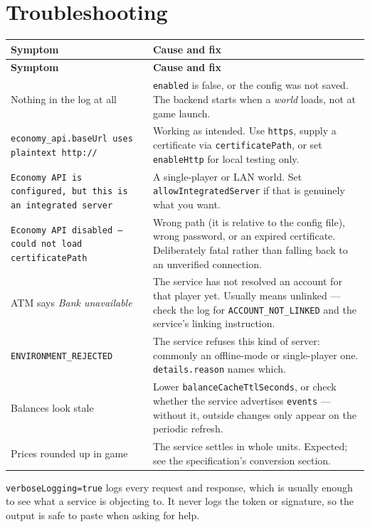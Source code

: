 \documentclass[11pt,a4paper]{article}
\newcommand{\code}[1]{\texttt{\small #1}}
\newcommand{\keybox}[2]{%
  \par\vspace{0.5em}\noindent
  \colorbox{#1}{\begin{minipage}{\dimexpr\linewidth-2\fboxsep\relax}
  \vspace{0.35em}\small #2\vspace{0.35em}\end{minipage}}\par\vspace{0.5em}}
\newcommand{\note}[1]{\keybox{omceWash}{#1}}
\begin{document}
\section{Troubleshooting}

\begin{longtable}{L{5.6cm} L{9.6cm}}
\toprule
\textbf{Symptom} & \textbf{Cause and fix}\\
\midrule
\endfirsthead
\toprule
\textbf{Symptom} & \textbf{Cause and fix}\\
\midrule
\endhead
Nothing in the log at all &
  \code{enabled} is false, or the config was not saved. The backend starts when a \emph{world}
  loads, not at game launch.\\
\code{economy\_api.baseUrl uses plaintext http://} &
  Working as intended. Use \code{https}, supply a certificate via \code{certificatePath}, or set
  \code{enableHttp} for local testing only.\\
\code{Economy API is configured, but this is an integrated server} &
  A single-player or LAN world. Set \code{allowIntegratedServer} if that is genuinely what you
  want.\\
\code{Economy API disabled --- could not load certificatePath} &
  Wrong path (it is relative to the config file), wrong password, or an expired certificate.
  Deliberately fatal rather than falling back to an unverified connection.\\
ATM says \emph{Bank unavailable} &
  The service has not resolved an account for that player yet. Usually means unlinked --- check
  the log for \code{ACCOUNT\_NOT\_LINKED} and the service's linking instruction.\\
\code{ENVIRONMENT\_REJECTED} &
  The service refuses this kind of server: commonly an offline-mode or single-player one.
  \code{details.reason} names which.\\
Balances look stale &
  Lower \code{balanceCacheTtlSeconds}, or check whether the service advertises \code{events} ---
  without it, outside changes only appear on the periodic refresh.\\
Prices rounded up in game &
  The service settles in whole units. Expected; see the specification's conversion section.\\
\bottomrule
\end{longtable}

\note{\code{verboseLogging=true} logs every request and response, which is usually enough to see
what a service is objecting to. It never logs the token or signature, so the output is safe to
paste when asking for help.}
\end{document}
